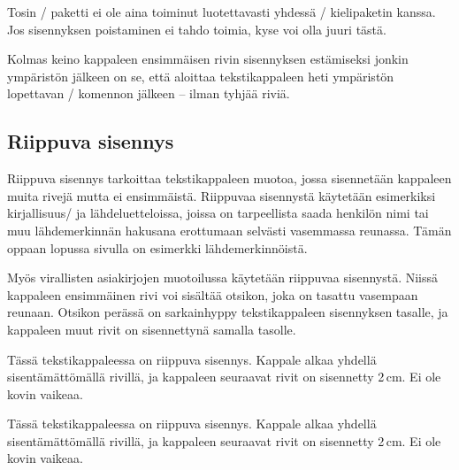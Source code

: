 \begin{koodilohkosis}
\end{koodilohkosis}

\noindent
Tosin \-/ paketti ei ole aina toiminut
luotettavasti yhdessä \-/ kielipaketin kanssa. Jos
sisennyksen poistaminen ei tahdo toimia, kyse voi olla juuri tästä.

Kolmas keino kappaleen ensimmäisen rivin sisennyksen estämiseksi jonkin
ympäristön jälkeen on se, että aloittaa tekstikappaleen heti ympäristön
lopettavan \-/ komennon jälkeen -- ilman tyhjää riviä.

\subsection{Riippuva sisennys}
\label{luku/riippuva-sisennys}

Riippuva sisennys tarkoittaa tekstikappaleen muotoa, jossa sisennetään
kappaleen muita rivejä mutta ei ensimmäistä. Riippuvaa sisennystä
käytetään esimerkiksi kirjallisuus\-/{} ja lähdeluetteloissa, joissa on
tarpeellista saada henkilön nimi tai muu lähdemerkinnän hakusana
erottumaan selvästi vasemmassa reunassa. Tämän oppaan lopussa sivulla
\pageref{luku/kirjallisuutta} on esimerkki lähdemerkinnöistä.

Myös virallisten asiakirjojen muotoilussa käytetään riippuvaa
sisennystä. Niissä kappaleen ensimmäinen rivi voi sisältää otsikon, joka
on tasattu vasempaan reunaan. Otsikon perässä on sarkainhyppy
tekstikappaleen sisennyksen tasalle, ja kappaleen muut rivit on
sisennettynä samalla tasolle.

\begin{esimerkki*}
  \komentoi{,}

\begin{koodilohko}
Tässä tekstikappaleessa on riippuva sisennys. Kappale
alkaa yhdellä sisentämättömällä rivillä, ja kappaleen seuraavat rivit
on sisennetty 2\,cm. Ei ole kovin vaikeaa.
\end{koodilohko}
  \begin{tulos}
    Tässä tekstikappaleessa on riippuva sisennys. Kappale
    alkaa yhdellä sisentämättömällä rivillä, ja kappaleen seuraavat rivit
    on sisennetty 2\,cm. Ei ole kovin vaikeaa.
  \end{tulos}
  \caption{Riippuva sisennys \-/ paketin ja sen
    \-/ komennon avulla}
  \label{esim/riippuva-sis-hangpara}
\end{esimerkki*}

